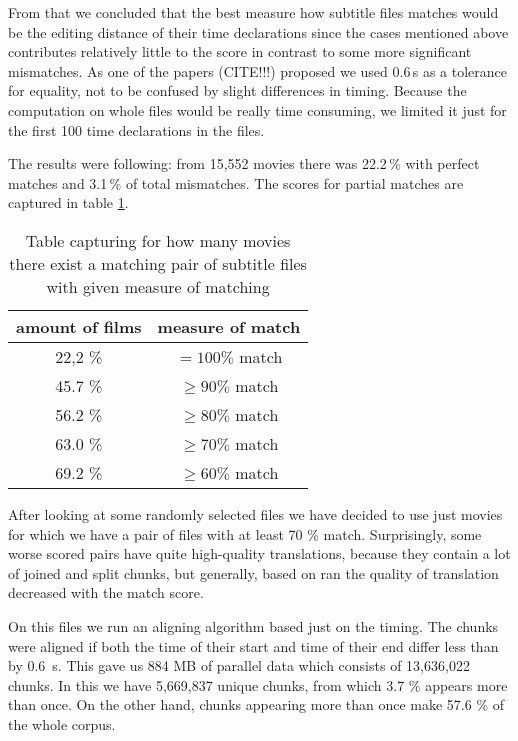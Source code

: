 From that we concluded that the best measure how subtitle files matches would be the editing distance of their time declarations since the cases mentioned above contributes relatively little to the score in contrast to some more significant mismatches. As one of the papers (CITE!!!) proposed we used 0.6\,s as a tolerance for equality, not to be confused by slight differences in timing. Because the computation on whole files would be really time consuming, we limited it just for the first 100 time declarations in the files.

The results were following: from 15,552 movies there was 22.2\,\%
with perfect matches and 3.1\,\% of total mismatches. The scores for partial matches are captured in table \ref{opensubtitles:matchTable}.

\begin{table}[h]

\begin{center}
\begin{tabular}{|c|c|}
\hline
amount of films & measure of match\\ \hline
22,2 \% & $= 100 \%$ match \\
45.7 \% & $\ge 90 \%$ match \\ 
56.2 \% & $\ge 80 \%$ match \\ 
63.0 \% & $\ge 70 \%$ match \\
69.2 \% & $\ge 60 \%$ match \\ \hline
\end{tabular}
\end{center}

\caption{Table capturing for how many movies there exist a matching pair of subtitle files with given measure of matching}\label{opensubtitles:matchTable}
\end{table}


After looking at some randomly selected files we have decided to use just movies for which we have a pair of files with at least 70 \% match. Surprisingly, some worse scored pairs have quite high-quality translations, because they contain a lot of joined and split chunks, but generally, based on ran the quality of translation decreased with the match score.

On this files we run an aligning algorithm based just on the timing. The chunks were aligned if both the time of their start and time of their end differ less than by 0.6\ s. This gave us 884 MB of parallel data which consists of 13,636,022 chunks. In this we have 5,669,837 unique chunks, from which 3.7 \% appears more than once. On the other hand, chunks appearing more than once make 57.6 \% of the whole corpus.
